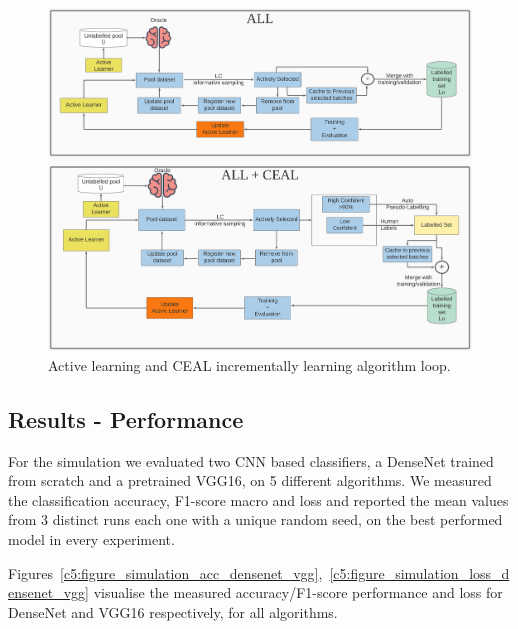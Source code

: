 \begin{figure}[ht!]
    \centering  
    \includegraphics[width=\textwidth]{figures/chap5/al/al_all_ceal}
    \caption{Active learning and CEAL incrementally learning algorithm loop.}
    \label{c5:figure_al_ceal_loop}
\end{figure}


\subsection{Results - Performance}

For the simulation we evaluated two CNN based classifiers, a DenseNet trained from scratch and a pretrained VGG16, on 5 different algorithms.
We measured the classification accuracy, F1-score macro and loss and reported the mean values from 3 distinct runs each one with a unique random seed, on the best performed model in every experiment.

Figures~\ref{c5:figure_simulation_acc_densenet_vgg},~\ref{c5:figure_simulation_loss_densenet_vgg} visualise the measured accuracy/F1-score performance and loss for DenseNet and VGG16 respectively, for all algorithms.

